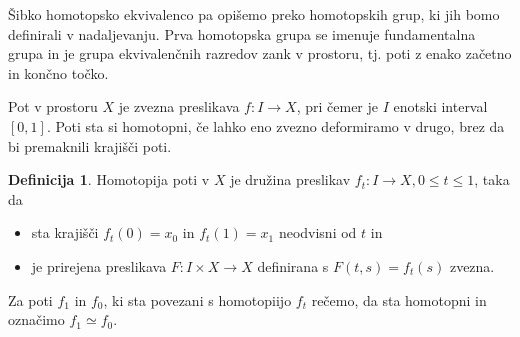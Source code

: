 \documentclass[a4paper,12pt]{article}
\theoremstyle{definition}
\newtheorem{definicija}{Definicija}
\theoremstyle{plain}
\theoremstyle{definition}
\theoremstyle{plain}
\theoremstyle{plain}
\theoremstyle{plain}
\theoremstyle{plain}
\begin{document}
Šibko homotopsko ekvivalenco pa opišemo preko homotopskih grup, ki
 jih bomo definirali v nadaljevanju. Prva homotopska grupa se imenuje
  fundamentalna grupa in je grupa ekvivalenčnih razredov zank v prostoru, 
 tj. poti z enako začetno in končno točko.

Pot v prostoru $X$ je zvezna preslikava $ f: I \rightarrow X$, pri čemer je $I$ enotski interval $[0,1]$. Poti sta si homotopni, če lahko eno zvezno deformiramo v drugo, brez da bi premaknili krajišči poti.
\begin{definicija}
    
    Homotopija poti v $X$ je družina preslikav $f_t:I \rightarrow X, 0\le t \le 1$, taka da
    \begin{itemize}
        \item 
        sta krajišči $f_t(0) = x_0$ in $f_t(1) = x_1$ neodvisni od $t$ in
        \item 
        je prirejena preslikava $F:I\times X \rightarrow X$ definirana s $F(t,s) = f_t(s)$ zvezna.
    \end{itemize}
    Za poti $f_1$ in $f_0$, ki sta povezani s homotopiijo $f_t$ rečemo, da sta homotopni in označimo $f_1 \simeq f_0$.
\end{definicija}
\end{document}
